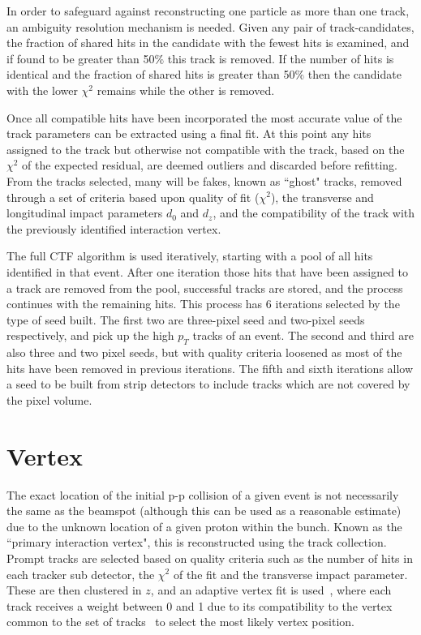 In order to safeguard against reconstructing one particle as more than one track, an ambiguity resolution mechanism is needed. Given any pair of track-candidates, the fraction of shared hits in the candidate with the fewest hits is examined, and if found to be greater than 50$\%$ this track is removed. If the number of hits is identical and the fraction of shared hits is greater than 50$\%$ then the candidate with the lower $\chi^{2}$ remains while the other is removed. 

Once all compatible hits have been incorporated the most accurate value of the track parameters can be extracted using a final fit. At this point any hits assigned to the track but otherwise not compatible with the track, based on the $\chi^{2}$ of the expected residual, are deemed outliers and discarded before refitting. From the tracks selected, many will be fakes, known as ``ghost" tracks, removed through a set of criteria based upon quality of fit ($\chi^{2}$), the transverse and longitudinal impact parameters $d_{0}$ and $d_{z}$, and the compatibility of the track with the previously identified interaction vertex. 

The full CTF algorithm is used iteratively, starting with a pool of all hits identified in that event. After one iteration those hits that have been assigned to a track are removed from the pool, successful tracks are stored, and the process continues with the remaining hits. This process has 6 iterations selected by the type of seed built. The first two are three-pixel seed and two-pixel seeds respectively, and pick up the high $p_{T}$ tracks of an event. The second and third are also three and two pixel seeds, but with quality criteria loosened as most of the hits have been removed in previous iterations. The fifth and sixth iterations allow a seed to be built from strip detectors to include tracks which are not covered by the pixel volume.

\section{Vertex}

The exact location of the initial p-p collision of a given event is not necessarily the same as the beamspot (although this can be used as a reasonable estimate) due to the unknown location of a given proton within the bunch. Known as the ``primary interaction vertex", this is reconstructed using the track collection. Prompt tracks are selected based on quality criteria such as the number of hits in each tracker sub detector, the $\chi^{2}$ of the fit and the transverse impact parameter. These are then clustered in $z$, and an adaptive vertex fit is used~\cite{AVF}, where each track receives a weight between 0 and 1 due to its compatibility to the vertex common to the set of tracks~\cite{TRK-10-005} to select the most likely vertex position. 


